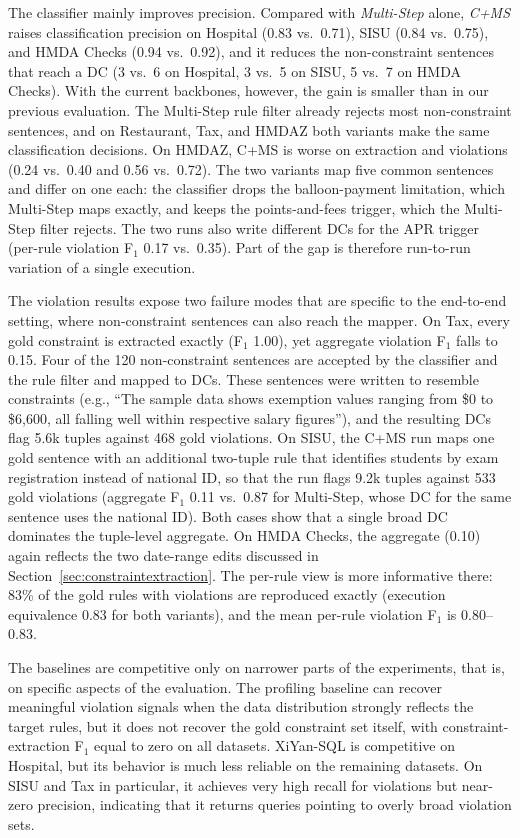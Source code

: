 The classifier mainly improves precision. Compared with \emph{Multi-Step} alone,
\emph{C+MS} raises classification precision on Hospital (0.83 vs.\ 0.71), SISU
(0.84 vs.\ 0.75), and HMDA Checks (0.94 vs.\ 0.92), and it reduces the
non-constraint sentences that reach a DC (3 vs.\ 6 on Hospital, 3 vs.\ 5 on SISU,
5 vs.\ 7 on HMDA Checks). With the current backbones, however, the gain is
smaller than in our previous evaluation. The Multi-Step rule filter already
rejects most non-constraint sentences, and on Restaurant, Tax, and HMDAZ both
variants make the same classification decisions. On HMDAZ, C+MS is worse on
extraction and violations (0.24 vs.\ 0.40 and 0.56 vs.\ 0.72). The two variants
map five common sentences and differ on one each: the classifier drops the
balloon-payment limitation, which Multi-Step maps exactly, and keeps the
points-and-fees trigger, which the Multi-Step filter rejects. The two runs also
write different DCs for the APR trigger (per-rule violation F$_1$ 0.17 vs.\
0.35). Part of the gap is therefore run-to-run variation of a single execution.

The violation results expose two failure modes that are specific to the
end-to-end setting, where non-constraint sentences can also reach the mapper.
On Tax, every gold constraint is extracted exactly (F$_1$ 1.00), yet aggregate
violation F$_1$ falls to 0.15. Four of the 120 non-constraint sentences are
accepted by the classifier and the rule filter and mapped to DCs. These
sentences were written to resemble constraints (e.g., ``The sample data shows
exemption values ranging from \$0 to \$6,600, all falling well within respective
salary figures''), and the resulting DCs flag 5.6k tuples against 468 gold
violations. On SISU, the C+MS run maps one gold sentence with an additional
two-tuple rule that identifies students by exam registration instead of national
ID, so that the run flags 9.2k tuples against 533 gold violations (aggregate F$_1$ 0.11 vs.\ 0.87 for Multi-Step, whose
DC for the same sentence uses the national ID). Both cases show that a single broad DC dominates the tuple-level
aggregate. On HMDA Checks, the aggregate (0.10) again reflects the two date-range
edits discussed in Section~\ref{sec:constraintextraction}. The per-rule view is
more informative there: 83\% of the gold rules with violations are reproduced
exactly (execution equivalence 0.83 for both variants), and the mean per-rule
violation F$_1$ is 0.80--0.83.

The baselines are competitive only on narrower parts of the experiments, that is, on specific aspects of the evaluation. The profiling baseline can recover meaningful violation signals when the data distribution strongly reflects the target rules, but it does not recover the gold
constraint set itself, with constraint-extraction F$_1$ equal to zero on all datasets. XiYan-SQL is competitive on Hospital, but its behavior is much less reliable on the remaining datasets. On SISU and Tax in particular, it achieves very high recall for violations but near-zero precision, indicating that it returns queries pointing to overly broad violation sets.

